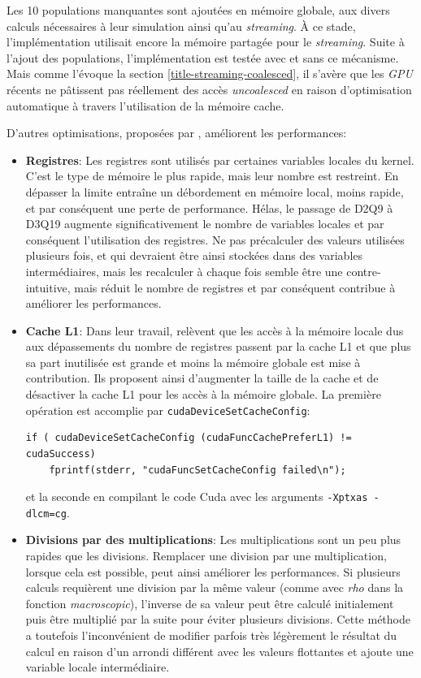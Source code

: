 Les 10 populations manquantes sont ajoutées en mémoire globale, aux divers calculs nécessaires à leur simulation ainsi qu'au \textit{streaming}. À ce stade, l'implémentation utilisait encore la mémoire partagée pour le \textit{streaming}. Suite à l'ajout des populations, l'implémentation est testée avec et sans ce mécanisme. Mais comme l'évoque la section \ref{title-streaming-coalesced}, il s'avère que les \textit{GPU} récents ne pâtissent pas réellement des accès \textit{uncoalesced} en raison d'optimisation automatique à travers l'utilisation de la mémoire cache.

D'autres optimisations, proposées par \cite{januszewski_sailfish:_2014,tran_performance_2017}, améliorent les performances:
\begin{itemize}
\item \textbf{Registres}: Les registres sont utilisés par certaines variables locales du kernel. C'est le type de mémoire le plus rapide, mais leur nombre est restreint. En dépasser la limite entraîne un débordement en mémoire local, moins rapide, et par conséquent une perte de performance. Hélas, le passage de D2Q9 à D3Q19 augmente significativement le nombre de variables locales et par conséquent l'utilisation des registres. Ne pas précalculer des valeurs utilisées plusieurs fois, et qui devraient être ainsi stockées dans des variables intermédiaires, mais les recalculer à chaque fois semble être une  contre-intuitive, mais réduit le nombre de registres et par conséquent contribue à améliorer les performances.
\item \textbf{Cache L1}: Dans leur travail, \cite{januszewski_sailfish:_2014} relèvent que les accès à la mémoire locale dus aux dépassements du nombre de registres passent par la cache L1 et que plus sa part inutilisée est grande et moins la mémoire globale est mise à contribution. Ils proposent ainsi d'augmenter la taille de la cache et de désactiver la cache L1 pour les accès à la mémoire globale. La première opération est accomplie par \texttt{cudaDeviceSetCacheConfig}:
\begin{lstlisting}[numbers=none]
if ( cudaDeviceSetCacheConfig (cudaFuncCachePreferL1) != cudaSuccess)
	fprintf(stderr, "cudaFuncSetCacheConfig failed\n");
\end{lstlisting}
et la seconde en compilant le code Cuda avec les arguments \texttt{-Xptxas -dlcm=cg}.
\item \textbf{Divisions par des multiplications}: Les multiplications sont un peu plus rapides que les divisions. Remplacer une division par une multiplication, lorsque cela est possible, peut ainsi améliorer les performances. Si plusieurs calculs requièrent une division par la même valeur (comme avec \textit{rho} dans la fonction \textit{macroscopic}), l'inverse de sa valeur peut être calculé initialement puis être multiplié par la suite pour éviter plusieurs divisions. Cette méthode a toutefois l'inconvénient de modifier parfois très légèrement le résultat du calcul en raison d'un arrondi différent avec les valeurs flottantes et ajoute une variable locale intermédiaire.
\end{itemize}

